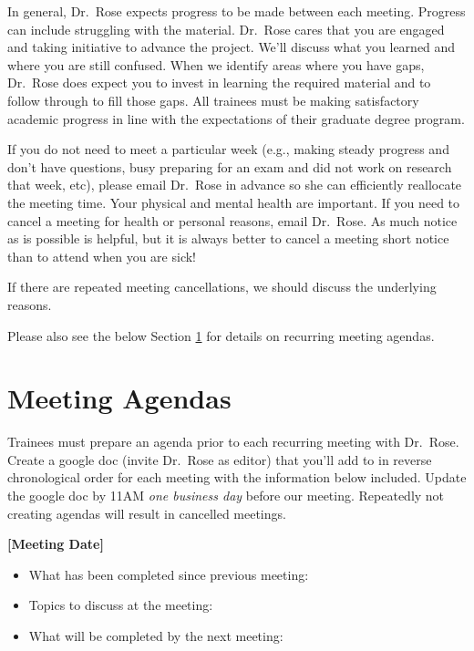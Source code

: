 \documentclass[
]{book}
\providecommand{\tightlist}{%
  \setlength{\itemsep}{0pt}\setlength{\parskip}{0pt}}
\begin{document}
In general, Dr.~Rose expects progress to be made between each meeting. Progress can include struggling with the material. Dr.~Rose cares that you are engaged and taking initiative to advance the project. We'll discuss what you learned and where you are still confused. When we identify areas where you have gaps, Dr.~Rose does expect you to invest in learning the required material and to follow through to fill those gaps. All trainees must be making satisfactory academic progress in line with the expectations of their graduate degree program.

If you do not need to meet a particular week (e.g., making steady progress and don't have questions, busy preparing for an exam and did not work on research that week, etc), please email Dr.~Rose in advance so she can efficiently reallocate the meeting time. Your physical and mental health are important. If you need to cancel a meeting for health or personal reasons, email Dr.~Rose. As much notice as is possible is helpful, but it is always better to cancel a meeting short notice than to attend when you are sick!

If there are repeated meeting cancellations, we should discuss the underlying reasons.

Please also see the below Section \ref{meeting-agendas} for details on recurring meeting agendas.

\hypertarget{meeting-agendas}{%
\section{Meeting Agendas}\label{meeting-agendas}}

Trainees must prepare an agenda prior to each recurring meeting with Dr.~Rose. Create a google doc (invite Dr.~Rose as editor) that you'll add to in reverse chronological order for each meeting with the information below included. Update the google doc by 11AM \emph{one business day} before our meeting. Repeatedly not creating agendas will result in cancelled meetings.

\textbf{{[}Meeting Date{]}}

\begin{itemize}
\tightlist
\item
  What has been completed since previous meeting:
\item
  Topics to discuss at the meeting:
\item
  What will be completed by the next meeting:
\end{itemize}
\end{document}
